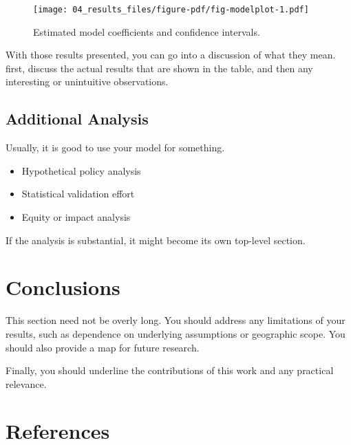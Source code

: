 \documentclass[
  letterpaper,
  DIV=11,
  numbers=noendperiod]{scrreprt}
\providecommand{\tightlist}{%
  \setlength{\itemsep}{0pt}\setlength{\parskip}{0pt}}\usepackage{longtable,booktabs,array}
\begin{document}
\begin{figure}

{\centering \texttt{[image: 04\_results\_files/figure-pdf/fig-modelplot-1.pdf]}

}

\caption{\label{fig-modelplot}Estimated model coefficients and
confidence intervals.}

\end{figure}

With those results presented, you can go into a discussion of what they
mean. first, discuss the actual results that are shown in the table, and
then any interesting or unintuitive observations.

\hypertarget{additional-analysis}{%
\section{Additional Analysis}\label{additional-analysis}}

Usually, it is good to use your model for something.

\begin{itemize}
\tightlist
\item
  Hypothetical policy analysis
\item
  Statistical validation effort
\item
  Equity or impact analysis
\end{itemize}

If the analysis is substantial, it might become its own top-level
section.


\hypertarget{conclusions}{%
\chapter{Conclusions}\label{conclusions}}

This section need not be overly long. You should address any limitations
of your results, such as dependence on underlying assumptions or
geographic scope. You should also provide a map for future research.

Finally, you should underline the contributions of this work and any
practical relevance.


\hypertarget{references}{%
\chapter*{References}\label{references}}
\end{document}
